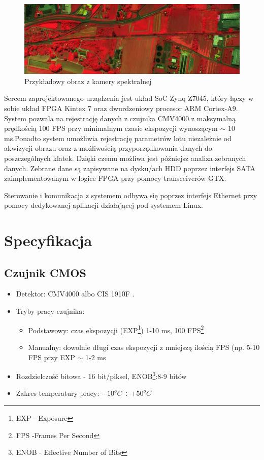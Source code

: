 \documentclass[a4paper,11pt,oneside]{book}  %
\begin{document}
\begin{figure}[htp]
	\centering
	\includegraphics[width=12cm]{spektrop_ex.jpg}
	\caption{Przykładowy obraz z kamery spektralnej\cite{SPEC_PHOTO}}
	\label{fig:EX_PHOTO}
\end{figure}


Sercem zaprojektowanego urządzenia jest układ SoC Zynq Z7045, który łączy w sobie układ FPGA Kintex 7 oraz dwurdzeniowy procesor ARM Cortex-A9. System pozwala na rejestrację danych z czujnika CMV4000 z maksymalną prędkością 100 FPS przy minimalnym czasie ekspozycji wynoszącym $\sim$ 10 ms.Ponadto system umożliwia rejestrację parametrów lotu niezależnie od akwizycji obrazu oraz z możliwością przyporządkowania danych do poszczególnych klatek. Dzięki czemu możliwa jest późniejsz analiza zebranych danych. Zebrane dane są zapisywane na dysku/ach HDD poprzez interfejs SATA zaimplementowanym w logice FPGA przy pomocy transceiverów GTX.

Sterowanie i komunikacja z systemem odbywa się poprzez interfejs Ethernet przy pomocy dedykowanej aplikacji działającej pod systemem Linux. 


\chapter{Specyfikacja}

\section{Czujnik CMOS}
\begin{itemize}
	\item Detektor: CMV4000 \cite{CMV4000} albo CIS 1910F \cite{CIS}.
	\item Tryby pracy czujnika:
		\begin{itemize}
			\item Podstawowy: czas ekspozycji (EXP\footnote{EXP - Exposure}) 1-10 ms, 100 FPS\footnote{FPS -Frames Per Second}
			\item Manualny:	dowolnie długi czas ekspozycji z mniejszą ilością FPS (np. 5-10 FPS przy EXP $\sim$ 1-2 ms
		\end{itemize}

	\item Rozdzielczość bitowa - 16 bit/piksel, ENOB\footnote{ENOB - Effective Number of Bits}:8-9 bitów
	\item Zakres temperatury pracy: $-10^{o}C \div +50^{o}C$

\end{itemize}
\end{document}
